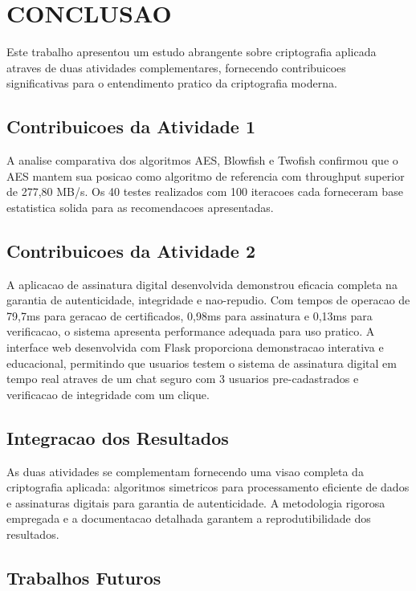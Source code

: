 \documentclass[12pt,a4paper,oneside]{article}
\begin{document}
\section{CONCLUSAO}

Este trabalho apresentou um estudo abrangente sobre criptografia aplicada atraves de duas atividades complementares, fornecendo contribuicoes significativas para o entendimento pratico da criptografia moderna.

\subsection{Contribuicoes da Atividade 1}

A analise comparativa dos algoritmos AES, Blowfish e Twofish confirmou que o AES mantem sua posicao como algoritmo de referencia com throughput superior de 277,80 MB/s. Os 40 testes realizados com 100 iteracoes cada forneceram base estatistica solida para as recomendacoes apresentadas.

\subsection{Contribuicoes da Atividade 2}

A aplicacao de assinatura digital desenvolvida demonstrou eficacia completa na garantia de autenticidade, integridade e nao-repudio. Com tempos de operacao de 79,7ms para geracao de certificados, 0,98ms para assinatura e 0,13ms para verificacao, o sistema apresenta performance adequada para uso pratico. A interface web desenvolvida com Flask proporciona demonstracao interativa e educacional, permitindo que usuarios testem o sistema de assinatura digital em tempo real atraves de um chat seguro com 3 usuarios pre-cadastrados e verificacao de integridade com um clique.

\subsection{Integracao dos Resultados}

As duas atividades se complementam fornecendo uma visao completa da criptografia aplicada: algoritmos simetricos para processamento eficiente de dados e assinaturas digitais para garantia de autenticidade. A metodologia rigorosa empregada e a documentacao detalhada garantem a reprodutibilidade dos resultados.

\subsection{Trabalhos Futuros}
\end{document}
